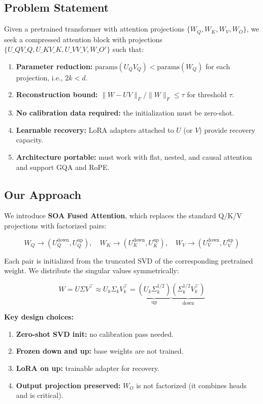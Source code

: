 \subsection{Problem Statement}

Given a pretrained transformer with attention projections $\{W_Q, W_K, W_V, W_O\}$, 
we seek a compressed attention block with projections $\{U\_Q V\_Q, U\_K V\_K, U\_V V\_V, 
W\_O'\}$ such that:

\begin{enumerate}
\item \textbf{Parameter reduction:} $\text{params}(U_Q V_Q) < \text{params}(W_Q)$ for
  each projection, i.e., $2k < d$.
\item \textbf{Reconstruction bound:} $\|W - UV\|_F / \|W\|_F \leq \tau$ for
  threshold $\tau$.
\item \textbf{No calibration data required:} the initialization must be zero-shot.
\item \textbf{Learnable recovery:} LoRA adapters attached to $U$ (or $V$) provide
  recovery capacity.
\item \textbf{Architecture portable:} must work with flat, nested, and causal attention
  and support GQA and RoPE.

\end{enumerate}
\subsection{Our Approach}

We introduce \textbf{SOA Fused Attention}, which replaces the standard Q/K/V 
projections with factorized pairs:

\[
W_Q \to (U_Q^{\text{down}}, U_Q^{\text{up}}), \quad
W_K \to (U_K^{\text{down}}, U_K^{\text{up}}), \quad
W_V \to (U_V^{\text{down}}, U_V^{\text{up}})
\]

Each pair is initialized from the truncated SVD of the corresponding 
pretrained weight. We distribute the singular values symmetrically:

\[
W = U \Sigma V^\top \approx U_k \Sigma_k V_k^\top
= \underbrace{(U_k \Sigma_k^{1/2})}_{\text{up}} 
  \underbrace{(\Sigma_k^{1/2} V_k^\top)}_{\text{down}}
\]

\textbf{Key design choices:}

\begin{enumerate}
\item \textbf{Zero-shot SVD init:} no calibration pass needed.
\item \textbf{Frozen down and up:} base weights are not trained.
\item \textbf{LoRA on up:} trainable adapter for recovery.
\item \textbf{Output projection preserved:} $W_O$ is not factorized (it combines
  heads and is critical).

\end{enumerate}
